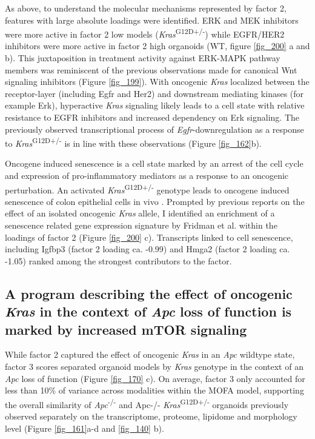\begin{flushleft}
As above, to understand the molecular mechanisms represented by factor 2, features with large absolute loadings were identified. ERK and MEK inhibitors were more active in factor 2 low models (\textit{Kras}\textsuperscript{G12D+/-}) while EGFR/HER2 inhibitors were more active in factor 2 high organoids (WT, figure \ref{fig_200} a and b). This juxtaposition in treatment activity against ERK-MAPK pathway members was reminiscent of the previous observations made for canonical Wnt signaling inhibitors (Figure \ref{fig_199}). With oncogenic \textit{Kras} localized between the receptor-layer (including Egfr and Her2) and downstream mediating kinases (for example Erk), hyperactive \textit{Kras} signaling likely leads to a cell state with relative resistance to EGFR inhibitors and increased dependency on Erk signaling. The previously observed transcriptional process of \textit{Egfr}-downregulation as a response to \textit{Kras}\textsuperscript{G12D+/-} is in line with these observations (Figure \ref{fig_162}b). 

\bigbreak

Oncogene induced senescence is a cell state marked by an arrest of the cell cycle and expression of pro-inflammatory mediators as a response to an oncogenic perturbation. An activated \textit{Kras}\textsuperscript{G12D+/-} genotype leads to oncogene induced senescence of colon epithelial cells in vivo . Prompted by previous reports on the effect of an isolated oncogenic \textit{Kras} allele, I identified an enrichment of a senescence related gene expression signature by Fridman et al. within the loadings of factor 2 \citep{fridmanCriticalPathwaysCellular2008} (Figure \ref{fig_200} c). Transcripts linked to cell senescence, including Igfbp3 (factor 2 loading ca. -0.99) and Hmga2 (factor 2 loading ca. -1.05) ranked among the strongest contributors to the factor. 
\bigbreak


\newpage
\subsection{A program describing the effect of oncogenic \textit{Kras} in the context of \textit{Apc} loss of function is marked by increased mTOR signaling }

While factor 2 captured the effect of oncogenic \textit{Kras} in an \textit{Apc} wildtype state, factor 3 scores separated organoid models by \textit{Kras} genotype in the context of an \textit{Apc} loss of function (Figure \ref{fig_170} c). On average, factor 3 only accounted for less than 10\% of variance across modalities within the MOFA model, supporting the overall similarity of \textit{Apc}\textsuperscript{-/-}  and Apc-/- \textit{Kras}\textsuperscript{G12D+/-} organoids previously observed separately on the transcriptome, proteome, lipidome and morphology level (Figure \ref{fig_161}a-d and \ref{fig_140} b).


\end{flushleft}
